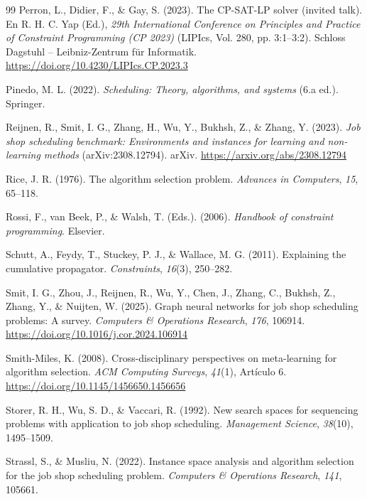 \begin{thebibliography}{99}
Perron, L., Didier, F., \& Gay, S. (2023). The CP-SAT-LP solver (invited
talk). En R. H. C. Yap (Ed.), \textit{29th International Conference on
Principles and Practice of Constraint Programming (CP 2023)} (LIPIcs, Vol.
280, pp. 3:1--3:2). Schloss Dagstuhl -- Leibniz-Zentrum für Informatik.
\url{https://doi.org/10.4230/LIPIcs.CP.2023.3}

Pinedo, M. L. (2022). \textit{Scheduling: Theory, algorithms, and systems}
(6.a ed.). Springer.

Reijnen, R., Smit, I. G., Zhang, H., Wu, Y., Bukhsh, Z., \& Zhang, Y. (2023).
\textit{Job shop scheduling benchmark: Environments and instances for learning
and non-learning methods} (arXiv:2308.12794). arXiv.
\url{https://arxiv.org/abs/2308.12794}

Rice, J. R. (1976). The algorithm selection problem. \textit{Advances in
Computers}, \textit{15}, 65--118.

Rossi, F., van Beek, P., \& Walsh, T. (Eds.). (2006). \textit{Handbook of
constraint programming}. Elsevier.

Schutt, A., Feydy, T., Stuckey, P. J., \& Wallace, M. G. (2011). Explaining
the cumulative propagator. \textit{Constraints}, \textit{16}(3), 250--282.

Smit, I. G., Zhou, J., Reijnen, R., Wu, Y., Chen, J., Zhang, C., Bukhsh, Z.,
Zhang, Y., \& Nuijten, W. (2025). Graph neural networks for job shop
scheduling problems: A survey. \textit{Computers \& Operations Research},
\textit{176}, 106914. \url{https://doi.org/10.1016/j.cor.2024.106914}

Smith-Miles, K. (2008). Cross-disciplinary perspectives on meta-learning for
algorithm selection. \textit{ACM Computing Surveys}, \textit{41}(1), Artículo 6.
\url{https://doi.org/10.1145/1456650.1456656}

Storer, R. H., Wu, S. D., \& Vaccari, R. (1992). New search spaces for
sequencing problems with application to job shop scheduling.
\textit{Management Science}, \textit{38}(10), 1495--1509.

Strassl, S., \& Musliu, N. (2022). Instance space analysis and algorithm
selection for the job shop scheduling problem. \textit{Computers \&
Operations Research}, \textit{141}, 105661.


\end{thebibliography}
